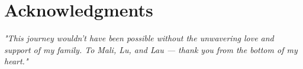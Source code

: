 


\chapter*{Acknowledgments}

\textit{"This journey wouldn't have been possible without the unwavering love and support of my family. To Mali, Lu, and 
Lau — thank you from the bottom of my heart."}
